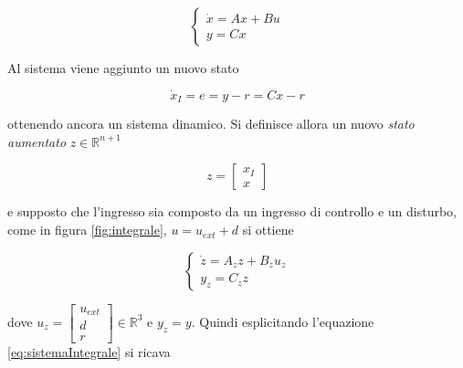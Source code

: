 		\begin{equation}
			\begin{cases}
				\dot{x}=Ax+Bu \\
				y=Cx
			\end{cases}
			\label{eq:sistemaNoD}
		\end{equation}
	
		\noindent Al sistema viene aggiunto un nuovo stato
		
		\begin{equation}
			\dot{x}_I=e=y-r=Cx-r
			\label{eq:NuovoStato}
		\end{equation}
	
		\noindent ottenendo ancora un sistema dinamico. Si definisce allora un nuovo \textit{stato aumentato} $z \in \mathbb{R}^{n+1}$
		
		\begin{equation}
			z=
			\begin{bmatrix}
				x_I \\
				x
			\end{bmatrix}
			\label{eq:statoAumentato}
		\end{equation}
	
		\noindent e supposto che l'ingresso sia composto da un ingresso di controllo e un disturbo, come in figura \ref{fig:integrale}, $u=u_{ext}+d$ si ottiene
		
		\begin{equation}
			\begin{cases}
				\dot{z}=A_zz+B_zu_z \\
				y_z=C_zz
			\end{cases}
			\label{eq:sistemaIntegrale}
		\end{equation}
		
		\noindent dove $u_z = \begin{bmatrix} u_{ext} \\ d \\ r \end{bmatrix} \in \mathbb{R}^3$ e $y_z=y$. Quindi esplicitando l'equazione \ref{eq:sistemaIntegrale} si ricava
		
